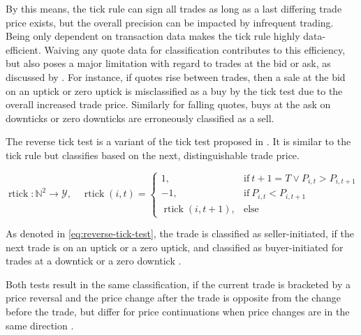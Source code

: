 By this means, the tick rule can sign all trades as long as a last differing trade price exists, but the overall precision can be impacted by infrequent trading. Being only dependent on transaction data makes the tick rule highly data-efficient. Waiving any quote data for classification contributes to this efficiency, but also poses a major limitation with regard to trades at the bid or ask, as discussed by \textcite[][557--558]{finucaneDirectTestMethods2000}. For instance, if quotes rise between trades, then a sale at the bid on an uptick or zero uptick is misclassified as a buy by the tick test due to the overall increased trade price. Similarly for falling quotes, buys at the ask on downticks or zero downticks are erroneously classified as a sell.



The reverse tick test is a variant of the tick test proposed in \textcite[][241]{hasbrouckTradesQuotesInventories1988}. It is similar to the tick rule but classifies based on the next, distinguishable trade price.

\begin{equation}
    \operatorname{rtick} \colon \mathbb{N}^2 \to \mathcal{Y},\quad
    \operatorname{rtick}(i, t)=
    \begin{cases}
        1,                            & \text{if}\ t+1=T \lor P_{i, t} > P_{i, t+1} \\
        -1,                           & \text{if}\ P_{i, t} < P_{i, t+1}            \\
        \operatorname{rtick}(i, t+1), & \text{else}
    \end{cases}
    \label{eq:reverse-tick-test}
\end{equation}

As denoted in \cref{eq:reverse-tick-test}, the trade is classified as seller-initiated, if the next trade is on an uptick or a zero uptick, and classified as buyer-initiated for trades at a downtick or a zero downtick \autocite[][735--636]{leeInferringTradeDirection1991}.

Both tests result in the same classification, if the current trade is bracketed by a price reversal and the price change after the trade is opposite from the change before the trade, but differ for price continuations when price changes are in the same direction \autocite[][736]{leeInferringTradeDirection1991}.

